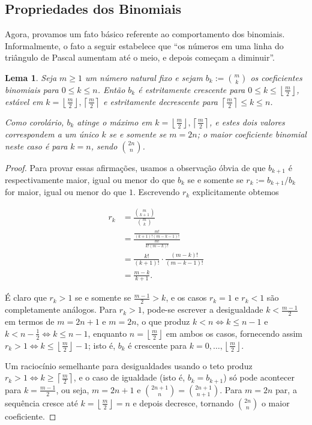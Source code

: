 \documentclass[11pt]{article}
\newtheorem{lemma}[theorem]{Lema}
\theoremstyle{remark}
\newcommand{\floor}[1]{\left\lfloor #1 \right\rfloor}
\newcommand{\ceil}[1]{\left\lceil #1 \right\rceil}
\newcommand{\vs}{\vspace{10px}}
\begin{document}
\vs
\subsection{Propriedades dos Binomiais}

Agora, provamos um fato básico referente ao comportamento dos binomiais. Informalmente, o fato a seguir estabelece que ``os números em uma linha do triângulo de Pascal aumentam até o meio, e depois começam a diminuir''. 

\begin{lemma} \label{lemma:binomial_monotonicity}
    Seja $m\ge 1$ um número natural fixo e sejam $b_k:= \binom{m}{k}$ os coeficientes binomiais para $0\le k\le n$. Então $b_k$ é estritamente crescente para $0\le k \le \floor{\frac m2}$, estável em $k=\floor{\frac m2}, \ceil{\frac m2}$ e estritamente decrescente para $\ceil{\frac m2}\le k\le n$.

    Como corolário, $b_k$ atinge o máximo em $k= \floor{\frac m2}, \ceil{\frac m2}$, e estes dois valores correspondem a um único $k$ se e somente se $m = 2n$; o maior coeficiente binomial neste caso é para $k = n$, sendo $\binom{2n}{n}$.
\end{lemma}
\vs

\begin{proof}
    Para provar essas afirmações, usamos a observação óbvia de que $b_{k+1}$ é respectivamente maior, igual ou menor do que $b_k$ se e somente se $r_k:=b_{k+1}/b_k$ for maior, igual ou menor do que $1$. Escrevendo $r_k$ explicitamente obtemos

    \begin{align*}
        r_k &= \frac{\binom{m}{k+1}}{\binom{m}{k}}\\
        &= \frac{\frac{m!}{(k+1)!(m-k-1)!}}{\frac{m!}{k!(m-k)!}}\\
        &= \frac{k!}{(k+1)!}\cdot \frac{(m-k)!}{(m-k-1)!}\\
        &= \frac{m-k}{k+1}.
    \end{align*}
    
    É claro que $r_k >1$ se e somente se $\frac{m-1}{2}> k$, e os casos $r_k=1$ e $r_k<1$ são completamente análogos. Para $r_k>1$, pode-se escrever a desigualdade $k<\frac{m-1}{2}$ em termos de $m=2n+1$ e $m= 2n$, o que produz $k<n\iff k\le n-1$ e $k<n-\frac 12\iff k\le n-1$, enquanto $n = \floor{\frac m2}$ em ambos os casos, fornecendo assim $r_k>1\iff k\le \floor{\frac m2}-1$; isto é, $b_k$ é crescente para $k=0,\ldots, \floor{\frac m2}$.
    
    Um raciocínio semelhante para desigualdades usando o teto produz $r_k>1\iff k\ge \ceil{\frac m2}$, e o caso de igualdade (isto é, $b_k=b_{k+1}$) só pode acontecer para $k= \frac{m-1}{2}$, ou seja, $m = 2n+1$ e $\binom{2n+1}{n}=\binom{2n+1}{n+1}$. Para $m=2n$ par, a sequência cresce até $k=\floor{\frac m2}=n$ e depois decresce, tornando $\binom{2n}{n}$ o maior coeficiente. 
\end{proof}\vs
\end{document}
